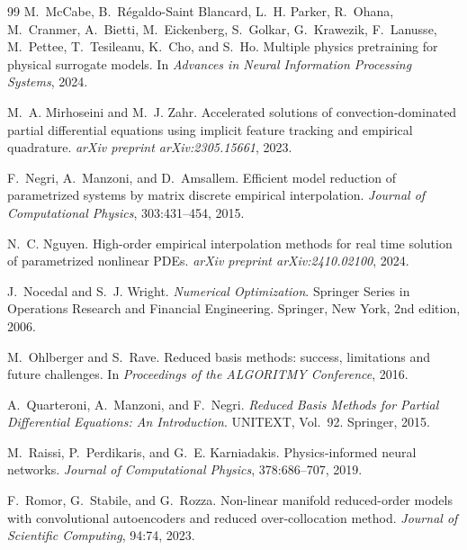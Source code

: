 \begin{thebibliography}{99}
M.~McCabe, B.~R\'egaldo-Saint Blancard, L.~H. Parker, R.~Ohana,
M.~Cranmer, A.~Bietti, M.~Eickenberg, S.~Golkar, G.~Krawezik,
F.~Lanusse, M.~Pettee, T.~Tesileanu, K.~Cho, and S.~Ho.
\newblock Multiple physics pretraining for physical surrogate models.
\newblock In \emph{Advances in Neural Information Processing Systems},
2024.

M.~A. Mirhoseini and M.~J. Zahr.
\newblock Accelerated solutions of convection-dominated partial
differential equations using implicit feature tracking and empirical
quadrature.
\newblock \emph{arXiv preprint arXiv:2305.15661}, 2023.

F.~Negri, A.~Manzoni, and D.~Amsallem.
\newblock Efficient model reduction of parametrized systems by matrix
discrete empirical interpolation.
\newblock \emph{Journal of Computational Physics}, 303:431--454, 2015.

N.~C. Nguyen.
\newblock High-order empirical interpolation methods for real time
solution of parametrized nonlinear PDEs.
\newblock \emph{arXiv preprint arXiv:2410.02100}, 2024.

J.~Nocedal and S.~J. Wright.
\newblock \emph{Numerical Optimization}.
\newblock Springer Series in Operations Research and Financial
Engineering. Springer, New York, 2nd edition, 2006.

M.~Ohlberger and S.~Rave.
\newblock Reduced basis methods: success, limitations and future
challenges.
\newblock In \emph{Proceedings of the ALGORITMY Conference}, 2016.

A.~Quarteroni, A.~Manzoni, and F.~Negri.
\newblock \emph{Reduced Basis Methods for Partial Differential
Equations: An Introduction}.
\newblock UNITEXT, Vol.~92. Springer, 2015.

M.~Raissi, P.~Perdikaris, and G.~E. Karniadakis.
\newblock Physics-informed neural networks.
\newblock \emph{Journal of Computational Physics}, 378:686--707, 2019.

F.~Romor, G.~Stabile, and G.~Rozza.
\newblock Non-linear manifold reduced-order models with convolutional
autoencoders and reduced over-collocation method.
\newblock \emph{Journal of Scientific Computing}, 94:74, 2023.


\end{thebibliography}
